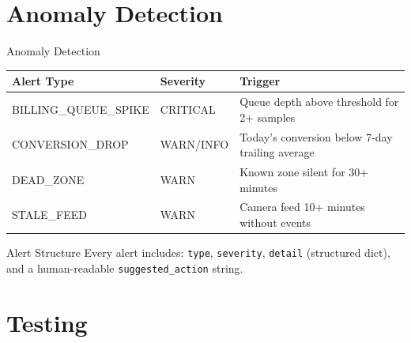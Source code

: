 \documentclass[aspectratio=169, 11pt]{beamer}
\begin{document}
\section{Anomaly Detection}

\begin{frame}{Anomaly Detection}
  \centering
  \begin{tabular}{llp{6cm}}
    \toprule
    \textbf{Alert Type} & \textbf{Severity} & \textbf{Trigger} \\
    \midrule
    BILLING\_QUEUE\_SPIKE & CRITICAL & Queue depth above threshold for 2+ samples \\
    CONVERSION\_DROP & WARN/INFO & Today's conversion below 7-day trailing average \\
    DEAD\_ZONE & WARN & Known zone silent for 30+ minutes \\
    STALE\_FEED & WARN & Camera feed 10+ minutes without events \\
    \bottomrule
  \end{tabular}

  \vspace{0.5cm}
  \begin{block}{Alert Structure}
    Every alert includes: \texttt{type}, \texttt{severity},
    \texttt{detail} (structured dict), and a human-readable
    \texttt{suggested\_action} string.
  \end{block}
\end{frame}

\section{Testing}
\end{document}
